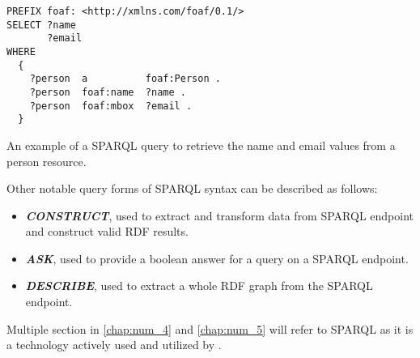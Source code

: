 \begin{listing}[H]    
\begin{verbatim}
PREFIX foaf: <http://xmlns.com/foaf/0.1/>
SELECT ?name 
       ?email
WHERE
  {
    ?person  a          foaf:Person .
    ?person  foaf:name  ?name .
    ?person  foaf:mbox  ?email .
  }
\end{verbatim}
\caption{An example of a SPARQL query to retrieve the name and email values from a person resource.} 
\label{lst:intro_triple_example}
\end{listing}

Other notable query forms of SPARQL syntax can be described as follows:
\begin{itemize}
    \item \textit{\textbf{CONSTRUCT}}, used to extract and transform data from SPARQL endpoint and construct valid RDF results.
    \item \textit{\textbf{ASK}}, used to provide a boolean answer for a query on a SPARQL endpoint.
    \item \textit{\textbf{DESCRIBE}}, used to extract a whole RDF graph from the SPARQL endpoint.
\end{itemize}

Multiple section in \autoref{chap:num_4} and \autoref{chap:num_5} will refer to SPARQL as it is a technology actively used and utilized by \solid{}.
 
\section{\solid{}}

